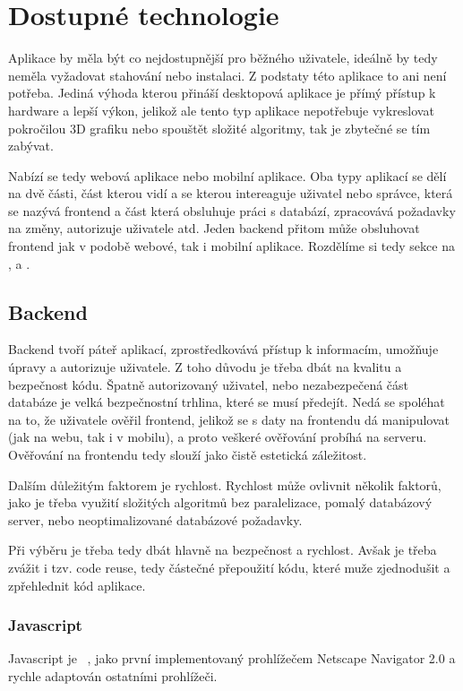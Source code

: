 \section{Dostupné technologie}
\label{sc:available_technologies}
Aplikace by měla být co nejdostupnější pro běžného uživatele, ideálně by tedy neměla vyžadovat stahování nebo instalaci. Z podstaty této aplikace to ani není potřeba. Jediná výhoda kterou přináší desktopová aplikace je přímý přístup k hardware a lepší výkon, jelikož ale tento typ aplikace nepotřebuje vykreslovat pokročilou 3D grafiku nebo spouštět složité algoritmy, tak je zbytečné se tím zabývat.

Nabízí se tedy webová aplikace nebo mobilní aplikace. Oba typy aplikací se dělí na dvě části, část kterou vidí a se kterou intereaguje uživatel nebo správce, která se nazývá frontend a část která obsluhuje práci s databází, zpracovává požadavky na změny, autorizuje uživatele atd. Jeden backend přitom může obsluhovat frontend jak v podobě webové, tak i mobilní aplikace. Rozdělíme si tedy sekce na ,  a .

\subsection{Backend}
\label{ss:backend}
Backend tvoří páteř aplikací, zprostředkovává přístup k informacím, umožňuje úpravy a autorizuje uživatele. Z toho důvodu je třeba dbát na kvalitu a bezpečnost kódu. Špatně autorizovaný uživatel, nebo nezabezpečená část databáze je velká bezpečnostní trhlina, které se musí předejít. Nedá se spoléhat na to, že uživatele ověřil frontend, jelikož se s daty na frontendu dá manipulovat (jak na webu, tak i v mobilu), a proto veškeré ověřování probíhá na serveru. Ověřování na frontendu tedy slouží jako čistě estetická záležitost.

Dalším důležitým faktorem je rychlost. Rychlost může ovlivnit několik faktorů, jako je třeba využití složitých algoritmů bez paralelizace, pomalý databázový server, nebo neoptimalizované databázové požadavky.

Při výběru je třeba tedy dbát hlavně na bezpečnost a rychlost. Avšak je třeba zvážit i tzv. code reuse, tedy částečné přepoužití kódu, které muže zjednodušit a zpřehlednit kód aplikace.

\subsubsection*{Javascript}
Javascript je \emph{}~\cite{netscapecommunicationscorporation_1995_press}, jako první implementovaný prohlížečem Netscape Navigator 2.0 a rychle adaptován ostatními prohlížeči.

